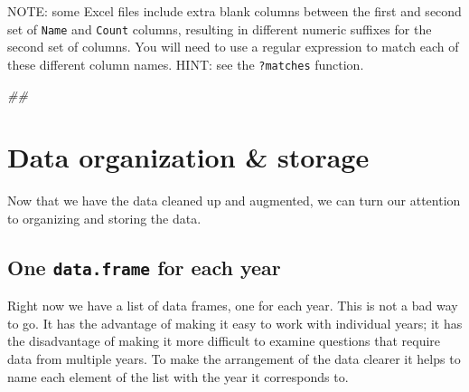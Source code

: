 \documentclass[]{book}
\newenvironment{Shaded}{\begin{snugshade}}{\end{snugshade}}
\newcommand{\CommentTok}[1]{\textcolor[rgb]{0.56,0.35,0.01}{\textit{#1}}}
\newcommand{\DataTypeTok}[1]{\textcolor[rgb]{0.13,0.29,0.53}{#1}}
\newcommand{\KeywordTok}[1]{\textcolor[rgb]{0.13,0.29,0.53}{\textbf{#1}}}
\newcommand{\NormalTok}[1]{#1}
\newcommand{\OperatorTok}[1]{\textcolor[rgb]{0.81,0.36,0.00}{\textbf{#1}}}
\newcommand{\StringTok}[1]{\textcolor[rgb]{0.31,0.60,0.02}{#1}}
\begin{document}
NOTE: some Excel files include extra blank columns between the first and second
set of \texttt{Name} and \texttt{Count} columns, resulting in different numeric suffixes
for the second set of columns. You will need to use a regular expression
to match each of these different column names. HINT: see the \texttt{?matches}
function.

\begin{Shaded}
\begin{Highlighting}[]
\CommentTok{## }
\end{Highlighting}
\end{Shaded}

\hypertarget{data-organization-storage}{%
\section{Data organization \& storage}\label{data-organization-storage}}

Now that we have the data cleaned up and augmented, we can turn our attention to organizing and storing the data.

\hypertarget{one-data.frame-for-each-year}{%
\subsection{\texorpdfstring{One \texttt{data.frame} for each year}{One data.frame for each year}}\label{one-data.frame-for-each-year}}

Right now we have a list of data frames, one for each year. This is not a bad way to go. It has the advantage of making it easy to work with individual years; it has the disadvantage of making it more difficult to examine questions that require data from multiple years. To make the arrangement of the data clearer it helps to name each element of the list with the year it corresponds to.

\begin{Shaded}
\end{Shaded}
\end{document}
